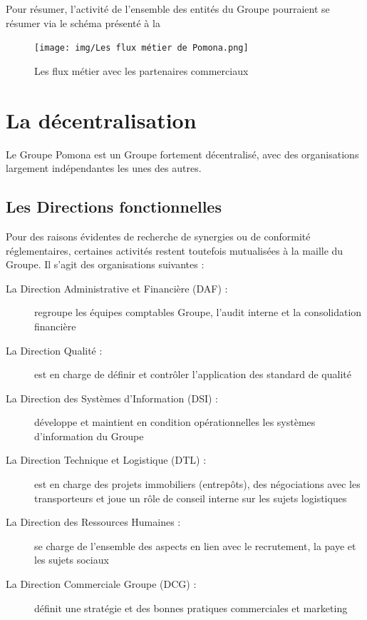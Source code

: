         Pour résumer, l'activité de l'ensemble des entités du Groupe pourraient se résumer via le schéma présenté à la 

        \begin{figure}[htbp]
            \begin{center}
            \texttt{[image: img/Les flux métier de Pomona.png]}
            \end{center}
            \caption{Les flux métier avec les partenaires commerciaux}
            \label{fig:flux metier}
        \end{figure}


        \section{La décentralisation}
        
        Le Groupe Pomona est un Groupe fortement décentralisé, avec des organisations largement indépendantes les unes des autres. 

            \subsection{Les Directions fonctionnelles}

            Pour des raisons évidentes de recherche de synergies ou de conformité réglementaires, certaines activités restent toutefois mutualisées à la maille du Groupe.
            Il s'agit des organisations suivantes :
            \begin{description}
                \item[La Direction Administrative et Financière (DAF) :] regroupe les équipes comptables Groupe, l'audit interne et la consolidation financière
                \item[La Direction Qualité :] est en charge de définir et contrôler l'application des standard de qualité
                \item[La Direction des Systèmes d'Information (DSI) :] développe et maintient en condition opérationnelles les systèmes d'information du Groupe
                \item[La Direction Technique et Logistique (DTL) :] est en charge des projets immobiliers (entrepôts), des négociations avec les transporteurs et joue un rôle de conseil interne sur les sujets logistiques
                \item[La Direction des Ressources Humaines :] se charge de l'ensemble des aspects en lien avec le recrutement, la paye et les sujets sociaux
                \item[La Direction Commerciale Groupe (DCG) :] définit une stratégie et des bonnes pratiques commerciales et marketing
            \end{description}

